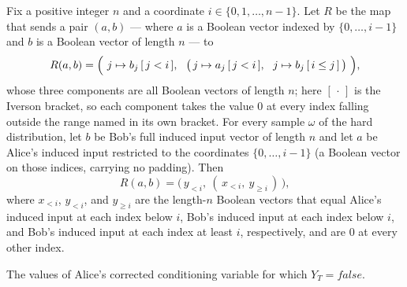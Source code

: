 \begin{theorem}
\label{CommunicationComplexity.Functions.Disjointness.RandomizedLowerBound.fixedAliceChainConditioningValue_fixedAliceFullYConditioning}
\leanok
{}
Fix a positive integer $n$ and a coordinate $i \in \{0,1,\dots,n-1\}$. Let $R$ be the
map that sends a pair $(a,b)$ — where $a$ is a Boolean vector indexed by
$\{0,\dots,i-1\}$ and $b$ is a Boolean vector of length $n$ — to
\[
R(a,b) = \Bigl(\ j\mapsto b_j\,[\,j<i\,],\ \ \bigl(\,j\mapsto a_j\,[\,j<i\,],\ \
j\mapsto b_j\,[\,i\le j\,]\,\bigr)\ \Bigr),
\]
whose three components are all Boolean vectors of length $n$; here $[\,\cdot\,]$ is the
Iverson bracket, so each component takes the value $0$ at every index falling outside
the range named in its own bracket. For every sample $\omega$ of the hard distribution,
let $b$ be Bob's full induced input vector of length $n$ and let $a$ be Alice's induced
input restricted to the coordinates $\{0,\dots,i-1\}$ (a Boolean vector on those
indices, carrying no padding). Then
\[
R(a,b) = \bigl(\,y_{<i},\ (\,x_{<i},\ y_{\ge i}\,)\,\bigr),
\]
where $x_{<i}$, $y_{<i}$, and $y_{\ge i}$ are the length-$n$ Boolean vectors that equal
Alice's induced input at each index below $i$, Bob's induced input at each index below
$i$, and Bob's induced input at each index at least $i$, respectively, and are $0$ at
every other index.
\end{theorem}

\begin{definition}[Aliceclaimconditioningyfalsevalues]
\label{CommunicationComplexity.Functions.Disjointness.RandomizedLowerBound.aliceClaimConditioningYFalseValues}
\leanok
The values of Alice's corrected conditioning variable for which $Y_{T} = false$.
\end{definition}

